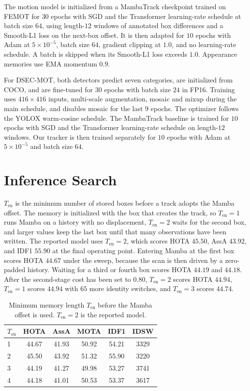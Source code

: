 \documentclass[10pt,twocolumn,letterpaper]{article}
\begin{document}
The motion model is initialized from a MambaTrack checkpoint trained on FEMOT for $30$ epochs with SGD and the Transformer learning-rate schedule at batch size $64$, using length-$12$ windows of annotated box differences and a Smooth-L1 loss on the next-box offset. It is then adapted for $10$ epochs with Adam at $5\times10^{-5}$, batch size $64$, gradient clipping at $1.0$, and no learning-rate schedule. A batch is skipped when its Smooth-L1 loss exceeds $1.0$. Appearance memories use EMA momentum $0.9$.

For DSEC-MOT, both detectors predict seven categories, are initialized from COCO, and are fine-tuned for $30$ epochs with batch size $24$ in FP16. Training uses $416\times416$ inputs, multi-scale augmentation, mosaic and mixup during the main schedule, and disables mosaic for the last $9$ epochs. The optimizer follows the YOLOX warm-cosine schedule. The MambaTrack baseline is trained for $10$ epochs with SGD and the Transformer learning-rate schedule on length-$12$ windows. Our tracker is then trained separately for $10$ epochs with Adam at $5\times10^{-5}$ and batch size $64$.

\section{Inference Search}

$T_{\mathrm{en}}$ is the minimum number of stored boxes before a track adopts the Mamba offset. The memory is initialized with the box that creates the track, so $T_{\mathrm{en}}=1$ runs Mamba on a history with no displacement, $T_{\mathrm{en}}=2$ waits for the second box, and larger values keep the last box until that many observations have been written. The reported model uses $T_{\mathrm{en}}=2$, which scores HOTA $45.50$, AssA $43.92$, and IDF1 $55.90$ at the final operating point. Entering Mamba at the first box scores HOTA $44.67$ under the sweep, because the scan is then driven by a zero-padded history. Waiting for a third or fourth box scores HOTA $44.19$ and $44.18$. After the second-stage cost has been set to $0.80$, $T_{\mathrm{en}}=2$ scores HOTA $44.94$, $T_{\mathrm{en}}=1$ scores $44.94$ with $65$ more identity switches, and $T_{\mathrm{en}}=3$ scores $44.74$.

\begin{table}[H]
  \centering
  \small
  \setlength{\tabcolsep}{3.2pt}
  \caption{Minimum memory length $T_{\mathrm{en}}$ before the Mamba offset is used. $T_{\mathrm{en}}=2$ is the reported model.}
  \label{tab:enable}
  \begin{tabular}{lccccc}
    \toprule
    $T_{\mathrm{en}}$ & HOTA & AssA & MOTA & IDF1 & IDSW \\
    \midrule
    1 & 44.67 & 41.93 & 50.92 & 54.21 & 3329 \\
    \rowcolor{oursrow}
    2 & 45.50 & 43.92 & 51.32 & 55.90 & 3220 \\
    3 & 44.19 & 41.27 & 49.98 & 53.27 & 3741 \\
    4 & 44.18 & 41.01 & 50.53 & 53.37 & 3617 \\
    \bottomrule
  \end{tabular}
\end{table}
\end{document}

